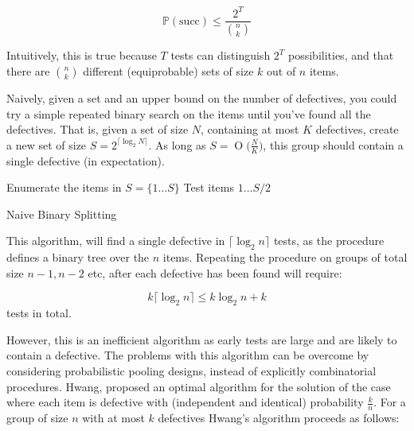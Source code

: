 \documentclass[11pt]{article}
\newcommand{\BigO}[1]{\ensuremath{\operatorname{O}\bigl(#1\bigr)}}
\begin{document}
\begin{equation}
\mathbb{P}\left(\text{succ}\right) \leq \frac{2^T}{\binom{n}{k}}
\end{equation}

Intuitively, this is true because \(T\) tests can distinguish \(2^T\) possibilities, and that there are \(\binom{n}{k}\) different (equiprobable) sets of size \(k\) out of \(n\) items. 

Naively, given a set and an upper bound on the number of defectives, you could try a simple repeated binary search on the items until you've found all the defectives. That is, given a set of size \(N\), containing at most \(K\) defectives, create a new set of size \(S = 2^{\lceil \log_2{N} \rceil}\). As long as \(S = \BigO{\frac{N}{K}}\), this group should contain a single defective (in expectation). 

\bigskip
\begin{algorithm}[H]
 \SetLine %
 Enumerate the items in \(S = \{1\ldots S\}\)\;
	Test items \(1\ldots S/2\)\;
 \caption{Naive Binary Splitting}
\end{algorithm}
\bigskip

This algorithm, will find a single defective in \(\lceil \log_2{n}\rceil\) tests, as the procedure defines a binary tree over the \(n\) items. Repeating the procedure on groups of total size \(n-1, n-2\) etc, after each defective has been found will require:


\begin{equation}
k\lceil\log_2{n}\rceil \leq k\log_2{n} + k
\end{equation}
tests in total. 

However, this is an inefficient algorithm as early tests are large and are likely to contain a defective. The problems with this algorithm can be overcome by considering probabilistic pooling designs, instead of explicitly combinatorial procedures. Hwang, proposed an optimal algorithm for the solution of the case where each item is defective with (independent and identical) probability \(\frac{k}{n}\). For a group of size \(n\) with at most \(k\) defectives Hwang's algorithm proceeds as follows:
\end{document}
